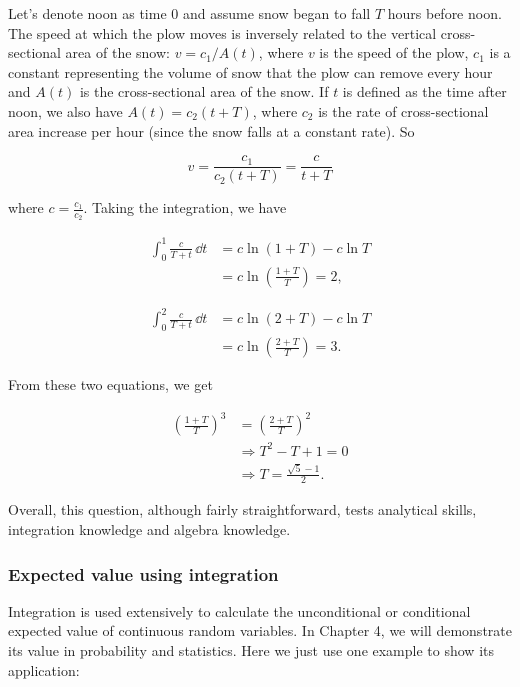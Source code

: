 \begin{solution}
Let's denote noon as time 0 and assume snow began to fall $T$ hours before noon. The speed
at which the plow moves is inversely related to the vertical cross-sectional area of the snow:
$v=c_1/A(t)$, where $v$ is the speed of the plow, $c_1$ is a constant representing the volume
of snow that the plow can remove every hour and $A(t)$ is the cross-sectional area of the snow.
If $t$ is defined as the time after noon, we also have $A(t)=c_2(t+T)$, where $c_2$ is the rate
of cross-sectional area increase per hour (since the snow falls at a constant rate). So

\[
  v=\frac{c_1}{c_2(t+T)}=\frac{c}{t+T}
\]

where $c=\frac{c_1}{c_2}$. Taking the integration, we have

\[
  \begin{aligned}
  \int_{0}^{1}\frac{c}{T+t}\,\dd t
  &=c\ln(1+T)-c\ln T\\
  &=c\ln\left(\frac{1+T}{T}\right)=2,
  \end{aligned}
\]

\[
  \begin{aligned}
  \int_{0}^{2}\frac{c}{T+t}\,\dd t
  &=c\ln(2+T)-c\ln T\\
  &=c\ln\left(\frac{2+T}{T}\right)=3.
  \end{aligned}
\]

From these two equations, we get

\[
  \begin{aligned}
  \left(\frac{1+T}{T}\right)^3
  &=\left(\frac{2+T}{T}\right)^2\\
  &\Rightarrow T^2-T+1=0\\
  &\Rightarrow T=\frac{\sqrt{5}-1}{2}.
  \end{aligned}
\]
\end{solution}

Overall, this question, although fairly straightforward, tests analytical skills,
integration knowledge and algebra knowledge.

\subsubsection*{Expected value using integration}

Integration is used extensively to calculate the unconditional or conditional expected value
of continuous random variables. In Chapter 4, we will demonstrate its value in probability and
statistics. Here we just use one example to show its application:

